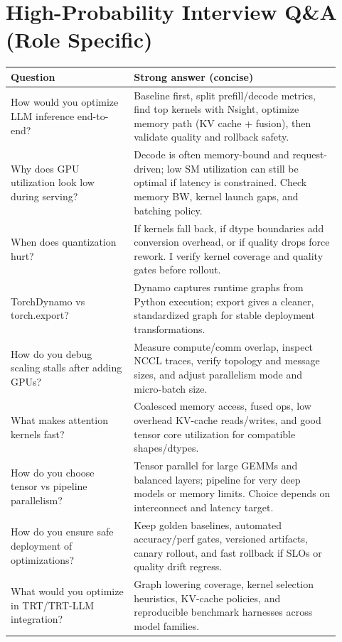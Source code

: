 \documentclass[11pt]{article}
\begin{document}
\section{High-Probability Interview Q\&A (Role Specific)}
\begin{center}
\begin{tabular}{|p{0.34\linewidth}|p{0.58\linewidth}|}
\hline
\textbf{Question} & \textbf{Strong answer (concise)} \\
\hline
How would you optimize LLM inference end-to-end? & Baseline first, split prefill/decode metrics, find top kernels with Nsight, optimize memory path (KV cache + fusion), then validate quality and rollback safety. \\
\hline
Why does GPU utilization look low during serving? & Decode is often memory-bound and request-driven; low SM utilization can still be optimal if latency is constrained. Check memory BW, kernel launch gaps, and batching policy. \\
\hline
When does quantization hurt? & If kernels fall back, if dtype boundaries add conversion overhead, or if quality drops force rework. I verify kernel coverage and quality gates before rollout. \\
\hline
TorchDynamo vs torch.export? & Dynamo captures runtime graphs from Python execution; export gives a cleaner, standardized graph for stable deployment transformations. \\
\hline
How do you debug scaling stalls after adding GPUs? & Measure compute/comm overlap, inspect NCCL traces, verify topology and message sizes, and adjust parallelism mode and micro-batch size. \\
\hline
What makes attention kernels fast? & Coalesced memory access, fused ops, low overhead KV-cache reads/writes, and good tensor core utilization for compatible shapes/dtypes. \\
\hline
How do you choose tensor vs pipeline parallelism? & Tensor parallel for large GEMMs and balanced layers; pipeline for very deep models or memory limits. Choice depends on interconnect and latency target. \\
\hline
How do you ensure safe deployment of optimizations? & Keep golden baselines, automated accuracy/perf gates, versioned artifacts, canary rollout, and fast rollback if SLOs or quality drift regress. \\
\hline
What would you optimize in TRT/TRT-LLM integration? & Graph lowering coverage, kernel selection heuristics, KV-cache policies, and reproducible benchmark harnesses across model families. \\

\end{tabular}
\end{center}
\end{document}
